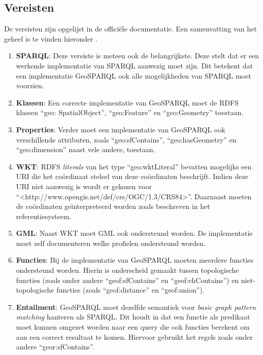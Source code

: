 \subsection{Vereisten}
De vereisten zijn opgelijst in de officiële documentatie. Een samenvatting van het geheel is te vinden hieronder \cite{ogcdocs}. 
\begin{enumerate}
    \item \textbf{SPARQL}: Deze vereiste is meteen ook de belangrijkste. Deze stelt dat er een werkende implementatie van SPARQL aanwezig moet zijn. Dit betekent dat een implementatie GeoSPARQL ook alle mogelijkheden van SPARQL moet voorzien.
    \item \textbf{Klassen}: Een correcte implementatie van GeoSPARQL moet de RDFS klassen ``geo: SpatialObject'', ``geo:Feature'' en ``geo:Geometry'' toestaan.
    \item \textbf{Properties}: Verder moet een implementatie van GeoSPARQL ook verschillende attributen, zoals ``geo:sfContains'', ``geo:hasGeometry'' en ``geo:dimension'' naast vele andere, toestaan.
    \item \textbf{WKT}: RDFS \textit{literals} van het type ``geo:wktLiteral'' bevatten mogelijks een URI die het coördinaat stelsel van deze coördinaten beschrijft. Indien deze URI niet aanwezig is wordt er gekozen voor ``<http://www.opengis.net/def/crs/OGC/1.3/CRS84>''. Daarnaast moeten de coördinaten geïnterpreteerd worden zoals beschreven in het referentiesysteem.
    \item \textbf{GML}: Naast WKT moet GML ook ondersteund worden. De implementatie moet zelf documenteren welke profielen ondersteund worden.
    \item \textbf{Functies}: Bij de implementatie van GeoSPARQL moeten meerdere functies ondersteund worden. Hierin is onderscheid gemaakt tussen topologische functies (zoals onder andere ``geof:sfContains'' en ``geof:ehContains'') en niet-topologische functies (zoals ``geof:distance'' en ``geof:union'').
    \item \textbf{Entailment}: GeoSPARQL moet dezelfde semantiek voor \textit{basic graph pattern matching} hanteren als SPARQL. Dit houdt in dat een functie als predikaat moet kunnen omgezet worden naar een query die ook functies berekent om aan een correct resultaat te komen. Hiervoor gebruikt het regels zoals onder andere ``geor:sfContains''.
\end{enumerate}


